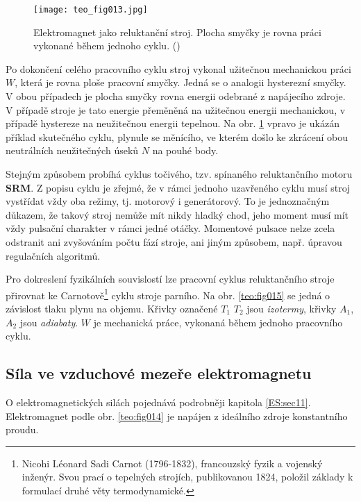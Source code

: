       \begin{figure}[ht!] %
        \centering
        \texttt{[image: teo\_fig013.jpg]}
        \caption{Elektromagnet jako reluktanční stroj. Plocha smyčky je rovna práci vykonané během
                 jednoho cyklu.
                 (\cite[s.~164]{Patocka4})}
        \label{teo:fig013}
      \end{figure}

      Po dokončení celého pracovního cyklu stroj vykonal užitečnou mechanickou práci \(W\), která 
      je rovna ploše pracovní smyčky. Jedná se o analogii hysterezní smyčky. V obou případech je 
      plocha smyčky rovna energii odebrané z napájecího zdroje. V případě stroje je tato energie 
      přeměněná na užitečnou energii mechanickou, v případě hystereze na neužitečnou energii 
      tepelnou. Na obr. \ref{teo:fig013} vpravo je ukázán příklad skutečného cyklu, plynule se 
      měnícího, ve kterém došlo ke zkrácení obou neutrálních neužitečných úseků \(N\) na pouhé body.


      Stejným způsobem probíhá cyklus točivého, tzv. spínaného reluktančního motoru \textbf{SRM}. Z 
      popisu cyklu je zřejmé, že v rámci jednoho uzavřeného cyklu musí stroj vystřídat vždy oba 
      režimy, tj. motorový i generátorový. To je jednoznačným důkazem, že takový stroj nemůže mít 
      nikdy hladký chod, jeho moment musí mít vždy pulsační charakter v rámci jedné otáčky. 
      Momentové pulsace nelze zcela odstranit ani zvyšováním počtu fází stroje, ani jiným způsobem, 
      např. úpravou regulačních algoritmů.

      Pro dokreslení fyzikálních souvislostí lze pracovní cyklus reluktančního stroje přirovnat ke 
      Carnotově\footnote{Nicohi Léonard Sadi Carnot (1796-1832), francouzský fyzik a vojenský 
      inženýr. Svou prací o tepelných strojích, publikovanou 1824, položil základy k formulací 
      druhé věty termodynamické.} cyklu stroje parního. Na obr. \ref{teo:fig015} se jedná o 
      závislost tlaku plynu na objemu. Křivky označené \(T_1\) \(T_2\) jsou \emph{izotermy}, křivky 
      \(A_1\), \(A_2\) jsou \emph{adiabaty}. \(W\) je mechanická práce, vykonaná během jednoho 
      pracovního cyklu.

      
    \subsection{Síla ve vzduchové mezeře elektromagnetu}
       O elektromagnetických silách pojednává podrobněji kapitola \ref{ES:sec11}. Elektromagnet 
       podle obr. \ref{teo:fig014} je napájen z ideálního zdroje konstantního proudu.
       
